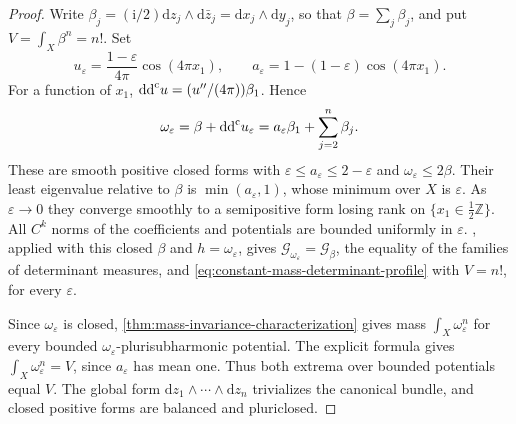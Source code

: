 \begin{proof}
Write
$\beta_j=(\mathrm i/2)\mathrm dz_j\wedge\mathrm d\bar z_j=\mathrm dx_j\wedge\mathrm dy_j$,
so that $\beta=\sum_j\beta_j$, and put $V=\int_X\beta^n=n!$.
Set
\[
 u_\varepsilon=\frac{1-\varepsilon}{4\pi}\cos(4\pi x_1),
 \qquad a_\varepsilon=1-(1-\varepsilon)\cos(4\pi x_1).
\]
For a function of $x_1$, $\mathrm{dd}^{\mathrm{c}} u=(u''/(4\pi))\beta_1$.
Hence
\[
 \omega_\varepsilon=\beta+\mathrm{dd}^{\mathrm{c}} u_\varepsilon
 =a_\varepsilon\beta_1+\sum_{j=2}^n\beta_j.
\]
These are smooth positive closed forms with
$\varepsilon\leq a_\varepsilon\leq2-\varepsilon$ and
$\omega_\varepsilon\leq2\beta$. Their least eigenvalue relative to $\beta$
is $\min(a_\varepsilon,1)$, whose minimum over $X$ is $\varepsilon$. As $\varepsilon\to0$ they converge smoothly to a semipositive form
losing rank on $\{x_1\in\tfrac12\mathbb Z\}$.
All $C^k$ norms of the coefficients and potentials are
bounded uniformly in $\varepsilon$. , applied with this closed $\beta$ and $h=\omega_\varepsilon$, gives $\mathscr G_{\omega_\varepsilon}=\mathscr G_\beta$, the equality of the
families of determinant measures, and \eqref{eq:constant-mass-determinant-profile} with $V=n!$, for every $\varepsilon$.

Since $\omega_\varepsilon$ is closed, \cref{thm:mass-invariance-characterization} gives mass $\int_X\omega_\varepsilon^n$ for every bounded $\omega_\varepsilon$-plurisubharmonic potential. The explicit formula gives $\int_X\omega_\varepsilon^n=V$, since $a_\varepsilon$ has mean one.
Thus both extrema over bounded
potentials equal $V$. The global form
$\mathrm dz_1\wedge\cdots\wedge\mathrm dz_n$ trivializes the canonical bundle, and
closed positive forms are balanced and pluriclosed.
\end{proof}

